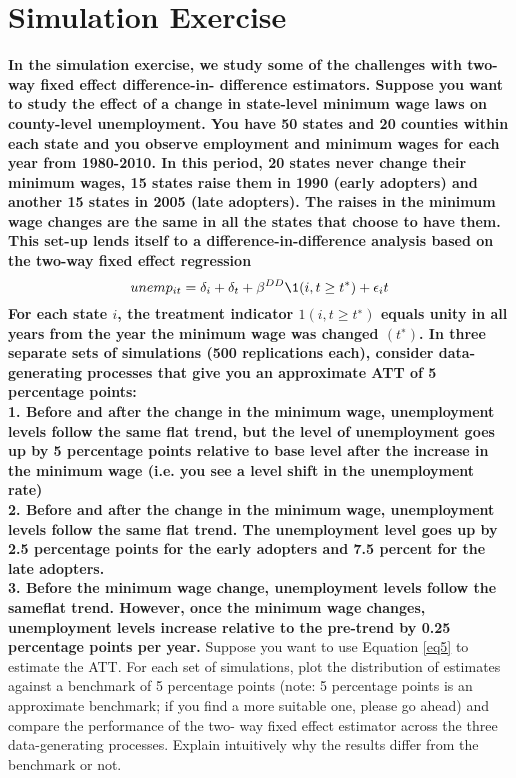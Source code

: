\documentclass[a4paper,12pt,oneside,English]{article}
\begin{document}
\section{Simulation Exercise}
\textbf{In the simulation exercise, we study some of the challenges with two-way fixed effect difference-in- difference estimators. Suppose you want to study the effect of a change in state-level minimum wage laws on county-level unemployment. You have 50 states and 20 counties within each state and you observe employment and minimum wages for each year from 1980-2010. In this period, 20 states never change their minimum wages, 15 states raise them in 1990 (early adopters) and another 15 states in 2005 (late adopters). The raises in the minimum wage changes are the same in all the states that choose to have them. This set-up lends itself to a difference-in-difference analysis based on the two-way fixed effect regression
\begin{equation}\label{eq5}
    unemp_{it} = \delta_i + \delta_t + \beta^{DD} \1(i,t\geq t^*)+ \epsilon_it
\end{equation}
For each state $i$, the treatment indicator $1(i, t \geq t^∗ )$ equals unity in all years from the year the minimum wage was changed $(t^∗)$. In three separate sets of simulations (500 replications each), consider data- generating processes that give you an approximate ATT of 5 percentage points:}\\
\textbf{1. Before and after the change in the minimum wage, unemployment levels follow the same flat trend, but the level of unemployment goes up by 5 percentage points relative to base level after the increase in the minimum wage (i.e. you see a level shift in the unemployment rate)}\\
\textbf{2. Before and after the change in the minimum wage, unemployment levels follow the same flat trend. The unemployment level goes up by 2.5 percentage points for the early adopters and 7.5 percent for the late adopters.}\\
\textbf{3. Before the minimum wage change, unemployment levels follow the sameflat trend. However, once the minimum wage changes, unemployment levels increase relative to the pre-trend by 0.25 percentage points per year.}
Suppose you want to use Equation \ref{eq5} to estimate the ATT. For each set of simulations, plot the distribution of estimates against a benchmark of 5 percentage points (note: 5 percentage points is an approximate benchmark; if you find a more suitable one, please go ahead) and compare the performance of the two- way fixed effect estimator across the three data-generating processes. Explain intuitively why the results differ from the benchmark or not.
\newpage
\end{document}
